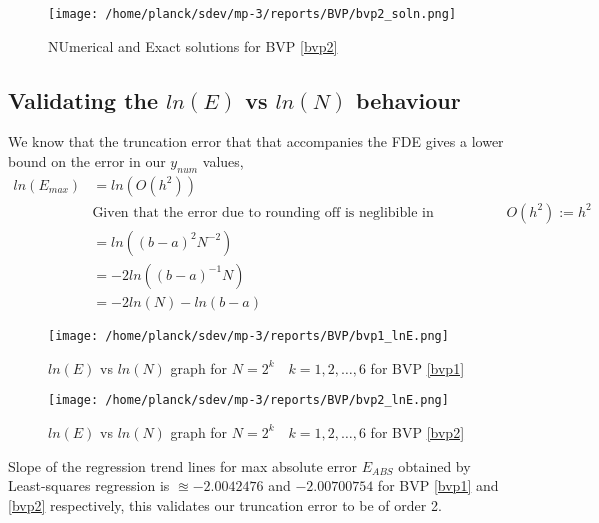 \documentclass[12pt]{article}
\begin{document}
	\begin{figure}[H]
		\centering
		\caption{NUmerical and Exact solutions for BVP \ref{bvp2}}
		\texttt{[image: /home/planck/sdev/mp-3/reports/BVP/bvp2\_soln.png]}
	\end{figure}
	\newpage
	\subsection{Validating the $ ln(E) $ vs $ ln(N) $ behaviour}
	We know that the truncation error that that accompanies the FDE gives a lower bound on the error in our $ y_{num} $ values,
	\begin{align}\label{key}
		ln(E_{max}) &= ln(O(h^2)) \qquad \nonumber\\ &\text{Given that the error due to rounding off is neglibible in comparison to truncation,$O(h^2) := h^2$}\nonumber\\
		&= ln((b-a)^2N^{-2}) \nonumber\\
		&= -2 ln((b-a)^{-1}N) \nonumber \\
		&= -2 ln(N) - ln(b-a)
	\end{align}
	\begin{figure}[H]
		\centering
		\caption{$ln(E)$ vs $ln(N)$ graph for $N = 2^k \quad k =1,2,\dots,6$ for BVP \ref{bvp1}}
		\texttt{[image: /home/planck/sdev/mp-3/reports/BVP/bvp1\_lnE.png]}
	\end{figure}
	
	\begin{figure}[H]
		\centering
		\caption{$ln(E)$ vs $ln(N)$ graph for $N = 2^k \quad k =1,2,\dots,6$ for BVP \ref{bvp2}}
		\texttt{[image: /home/planck/sdev/mp-3/reports/BVP/bvp2\_lnE.png]}
	\end{figure}
	
	Slope of the regression trend lines for max absolute error $E_{ABS}$ obtained by Least-squares regression is $\approxeq -2.0042476$ and $ -2.00700754$ for BVP \ref{bvp1} and \ref{bvp2} respectively, this validates our truncation error to be of order 2.
	
\end{document}
